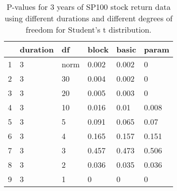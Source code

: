 \begin{table}[ht]
\centering
\caption{P-values for 3 years of SP100 stock return 
                   data using different durations
  and different degrees of freedom for Student's t distribution.} 
\label{table:SP1003}
\begin{tabular}{rlllll}
  \hline
 & duration & df & block & basic & param \\ 
  \hline
1 & 3 & norm & 0.002 & 0.002 & 0 \\ 
  2 & 3 & 30 & 0.004 & 0.002 & 0 \\ 
  3 & 3 & 20 & 0.005 & 0.003 & 0 \\ 
  4 & 3 & 10 & 0.016 & 0.01 & 0.008 \\ 
  5 & 3 & 5 & 0.091 & 0.065 & 0.07 \\ 
  6 & 3 & 4 & 0.165 & 0.157 & 0.151 \\ 
  7 & 3 & 3 & 0.457 & 0.473 & 0.506 \\ 
  8 & 3 & 2 & 0.036 & 0.035 & 0.036 \\ 
  9 & 3 & 1 & 0 & 0 & 0 \\ 
   \hline
\end{tabular}
\end{table}

